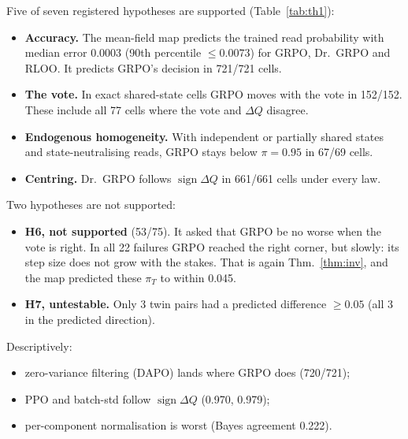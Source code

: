\documentclass[11pt]{article}
\newcommand{\sgn}{\operatorname{sign}}
\begin{document}
Five of seven registered hypotheses are supported (Table~\ref{tab:th1}):
\begin{itemize}
\item \textbf{Accuracy.} The mean-field map predicts the trained read probability with median error $0.0003$ (90th
percentile $\le0.0073$) for GRPO, Dr.~GRPO and RLOO. It predicts GRPO's decision in 721/721 cells.
\item \textbf{The vote.} In exact shared-state cells GRPO moves with the vote in 152/152. These include all 77 cells
where the vote and $\Delta Q$ disagree.
\item \textbf{Endogenous homogeneity.} With independent or partially shared states and state-neutralising reads,
GRPO stays below $\pi=0.95$ in 67/69 cells.
\item \textbf{Centring.} Dr.~GRPO follows $\sgn\Delta Q$ in 661/661 cells under every law.
\end{itemize}

Two hypotheses are not supported:
\begin{itemize}
\item \textbf{H6, not supported} (53/75). It asked that GRPO be no worse when the vote is right. In all 22 failures
GRPO reached the right corner, but slowly: its step size does not grow with the stakes. That is again
Thm.~\ref{thm:inv}, and the map predicted these $\pi_T$ to within 0.045.
\item \textbf{H7, untestable.} Only 3 twin pairs had a predicted difference $\ge0.05$ (all 3 in the predicted
direction).
\end{itemize}

Descriptively:
\begin{itemize}
\item zero-variance filtering (DAPO) lands where GRPO does (720/721);
\item PPO and batch-std follow $\sgn\Delta Q$ (0.970, 0.979);
\item per-component normalisation is worst (Bayes agreement 0.222).
\end{itemize}
\end{document}
